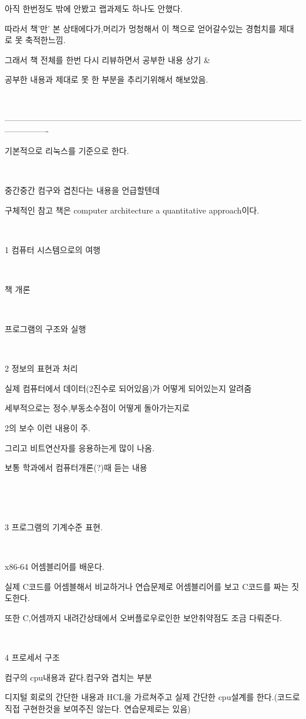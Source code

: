 아직 한번정도 밖에 안봤고 랩과제도 하나도 안했다.

따라서 책'만' 본 상태에다가,머리가 멍청해서 이 책으로 얻어갈수있는 경험치를 제대로 못 축적한느낌.

그래서 책 전체를 한번 다시 리뷰하면서 공부한 내용 상기 &

공부한 내용과 제대로 못 한 부분을 추리기위해서 해보았음.

​

----------------------------------------------------------------------------------------------------------------------------

기본적으로 리눅스를 기준으로 한다.

​

중간중간 컴구와 겹친다는 내용을 언급할텐데 

구체적인 참고 책은 computer architecture a quantitative approach이다.

​

1 컴퓨터 시스템으로의 여행

​

책 개론

​

프로그램의 구조와 실행

​

2 정보의 표현과 처리

실제 컴퓨터에서 데이터(2진수로 되어있음)가 어떻게 되어있는지 알려줌

세부적으로는 정수,부동소수점이 어떻게 돌아가는지로

2의 보수 이런 내용이 주.

그리고 비트연산자를 응용하는게 많이 나옴. 

보통 학과에서 컴퓨터개론(?)때 듣는 내용

​

​

3 프로그램의 기계수준 표현.

​

x86-64 어셈블리어를 배운다.

실제 C코드를 어셈블해서 비교하거나 연습문제로 어셈블리어를 보고 C코드를 짜는 짓도한다.

또한 C,어셈까지 내려간상태에서 오버플로우로인한 보안취약점도 조금 다뤄준다.

​

4 프로세서 구조

컴구의 cpu내용과 같다.컴구와 겹치는 부분

디지털 회로의 간단한 내용과 HCL을 가르쳐주고 실제 간단한 cpu설계를 한다.(코드로 직접 구현한것을 보여주진 않는다. 연습문제로는 있음)

